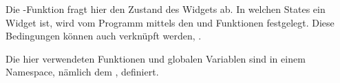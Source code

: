 Die -Funktion fragt hier den Zustand des Widgets ab.
In welchen States ein Widget ist, wird vom Programm mittels den  und
 Funktionen festgelegt.
Diese Bedingungen können auch verknüpft werden, \zB
{}.

Die hier verwendeten Funktionen und globalen Variablen sind in einem Namespace, nämlich dem
, definiert.

\renewcommand{\kapitelautor}{}
